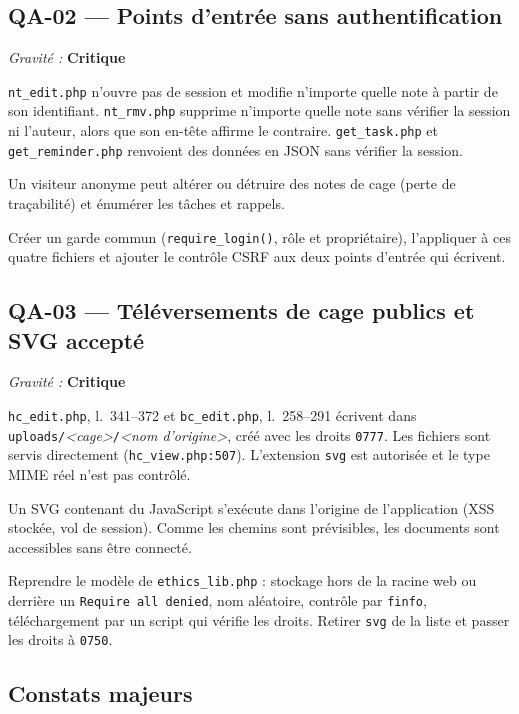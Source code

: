 \documentclass[11pt,a4paper]{article}
\newcommand{\crit}{\textcolor{crit}{\textbf{Critique}}}
\newcommand{\f}[1]{\nolinkurl{#1}}
\newenvironment{constat}[3]{%
  \subsection*{#1 --- #2}\noindent\textit{Gravité :} #3\par\smallskip
  \begin{description}[leftmargin=2.6cm,style=nextline,itemsep=2pt]}{\end{description}}
\begin{document}
\begin{constat}{QA-02}{Points d'entrée sans authentification}{\crit}
\item[Preuve] \f{nt_edit.php} n'ouvre pas de session et modifie n'importe quelle
  note à partir de son identifiant. \f{nt_rmv.php} supprime n'importe quelle note
  sans vérifier la session ni l'auteur, alors que son en-tête affirme le
  contraire. \f{get_task.php} et \f{get_reminder.php} renvoient des données en
  JSON sans vérifier la session.
\item[Risque] Un visiteur anonyme peut altérer ou détruire des notes de cage
  (perte de traçabilité) et énumérer les tâches et rappels.
\item[Action] Créer un garde commun (\f{require_login()}, rôle et propriétaire),
  l'appliquer à ces quatre fichiers et ajouter le contrôle CSRF aux deux points
  d'entrée qui écrivent.
\end{constat}

\begin{constat}{QA-03}{Téléversements de cage publics et SVG accepté}{\crit}
\item[Preuve] \f{hc_edit.php}, l.~341--372 et \f{bc_edit.php}, l.~258--291 écrivent dans
  \f{uploads/}\textit{<cage>}\f{/}\textit{<nom d'origine>}, créé avec les droits \f{0777}. Les fichiers
  sont servis directement (\f{hc_view.php:507}). L'extension \f{svg} est
  autorisée et le type MIME réel n'est pas contrôlé.
\item[Risque] Un SVG contenant du JavaScript s'exécute dans l'origine de
  l'application (XSS stockée, vol de session). Comme les chemins sont
  prévisibles, les documents sont accessibles sans être connecté.
\item[Action] Reprendre le modèle de \f{ethics_lib.php} : stockage hors de la
  racine web ou derrière un \texttt{Require all denied}, nom aléatoire, contrôle par
  \f{finfo}, téléchargement par un script qui vérifie les droits. Retirer
  \f{svg} de la liste et passer les droits à \f{0750}.
\end{constat}

\subsection{Constats majeurs}
\end{document}

